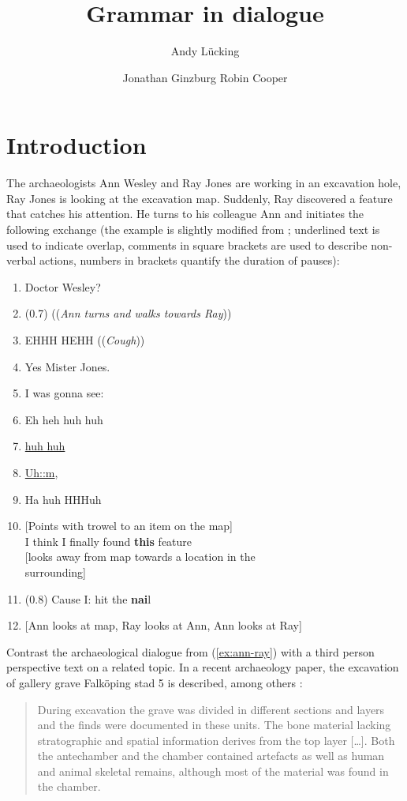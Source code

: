 \documentclass[output=paper]{langsci/langscibook}
\author{%
	Andy Lücking\affiliation{Goethe-Universität Frankfurt}%
	\and Jonathan Ginzburg\affiliation{Université de Paris}%
	\lastand Robin Cooper\affiliation{G\"{o}teborgs Universitet}%
}
\title{Grammar in dialogue}
\begin{document}
\label{chap-pragmatics}

\avmoptions{}
\avmfont{\footnotesize}
\avmsortfont{\itshape}


\section{Introduction} 
\label{sec:introduction}

The archaeologists Ann Wesley and Ray Jones are working in an excavation hole, Ray Jones is looking at the excavation map.
%
Suddenly, Ray discovered a feature that catches his attention. %
He turns to his colleague Ann and initiates the following exchange (the example is slightly modified from \citet[p.~222]{Goodwin:2003}; underlined text is used to indicate overlap, comments in square brackets are used to describe non-verbal actions, numbers in brackets quantify the duration of pauses):
%
\ea \label{ex:ann-ray}
\begin{enumerate}[noitemsep]
    \item {} Doctor Wesley?
    \item \speaking{} \quad (0.7) ((\textit{Ann turns and walks towards Ray}))
    \item {} EHHH HEHH ((\textit{Cough}))
    \item \speaking{} Yes Mister Jones.
    \item {} I was gonna see:
    \item {} \textdegree Eh heh huh huh
    \item \speaking{}  \underline{huh huh}
    \item {}  \underline{Uh::m},
    \item {} Ha huh HHHuh
    \item {} [Points with trowel to an item on the map] \\ 
    \speaking{} I think I finally found \textbf{this} feature \\
    \speaking{} [looks away from map towards a location in the\\ \speaking{} surrounding]
    \item \speaking{} (0.8) Cause I: hit the \textbf{nai}l
    \item { [Ann looks at map, Ray looks at Ann, Ann looks at Ray] }
\end{enumerate}
\z


Contrast the archaeological dialogue from (\ref{ex:ann-ray}) with a third person perspective text on a related topic.
%
In a recent archaeology paper, the excavation of gallery grave Falk\"{o}ping stad 5 is described, among others \citep[p.~4]{Blank:Tornberg:Knipper:2018}:
%
\begin{quote}
During excavation the grave was divided in different sections and layers and the finds were documented in these units. The bone material lacking stratographic and spatial information derives from the top layer [\ldots]. Both the antechamber and the chamber contained artefacts as well as human and animal skeletal remains, although most of the material was found in the chamber.
\end{quote}
\end{document}
